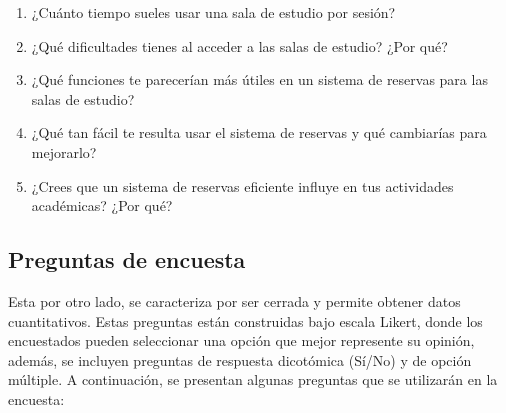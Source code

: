 \documentclass{article}
\begin{document}
\begin{enumerate}
  \item ¿Cuánto tiempo sueles usar una sala de estudio por sesión?
  \item ¿Qué dificultades tienes al acceder a las salas de estudio? ¿Por qué?
  \item ¿Qué funciones te parecerían más útiles en un sistema de reservas para las salas de estudio?
  \item ¿Qué tan fácil te resulta usar el sistema de reservas y qué cambiarías para mejorarlo?
  \item ¿Crees que un sistema de reservas eficiente influye en tus actividades académicas? ¿Por qué?
\end{enumerate}

\subsection{Preguntas de encuesta}

Esta por otro lado, se caracteriza por ser cerrada y permite obtener datos cuantitativos. Estas preguntas están construidas bajo escala Likert, donde los encuestados pueden seleccionar una opción que mejor represente su opinión, además, se incluyen preguntas de respuesta dicotómica (Sí/No) y de opción múltiple. A continuación, se presentan algunas preguntas que se utilizarán en la encuesta:
\end{document}
